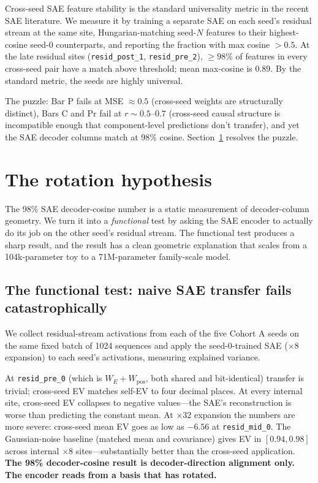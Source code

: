\documentclass[11pt,letterpaper]{article}
\begin{document}
Cross-seed SAE feature stability is the standard universality metric in the recent SAE literature. We measure it by training a separate SAE on each seed's residual stream at the same site, Hungarian-matching seed-$N$ features to their highest-cosine seed-0 counterparts, and reporting the fraction with max cosine $> 0.5$. At the late residual sites (\texttt{resid\_post\_1}, \texttt{resid\_pre\_2}), $\geq 98\%$ of features in every cross-seed pair have a match above threshold; mean max-cosine is $0.89$. By the standard metric, the seeds are highly universal.

The puzzle: Bar P fails at MSE $\approx 0.5$ (cross-seed weights are structurally distinct), Bars C and Pr fail at $r \sim 0.5$--$0.7$ (cross-seed causal structure is incompatible enough that component-level predictions don't transfer), and yet the SAE decoder columns match at 98\% cosine. Section~\ref{sec:rotation} resolves the puzzle.

\section{The rotation hypothesis}
\label{sec:rotation}

The 98\% SAE decoder-cosine number is a static measurement of decoder-column geometry. We turn it into a \emph{functional} test by asking the SAE encoder to actually do its job on the other seed's residual stream. The functional test produces a sharp result, and the result has a clean geometric explanation that scales from a 104k-parameter toy to a 71M-parameter family-scale model.

\subsection{The functional test: naive SAE transfer fails catastrophically}

We collect residual-stream activations from each of the five Cohort A seeds on the same fixed batch of 1024 sequences and apply the seed-0-trained SAE ($\times 8$ expansion) to each seed's activations, measuring explained variance.

At \texttt{resid\_pre\_0} (which is $W_E + W_{\mathrm{pos}}$, both shared and bit-identical) transfer is trivial; cross-seed EV matches self-EV to four decimal places. At every internal site, cross-seed EV collapses to negative values---the SAE's reconstruction is worse than predicting the constant mean. At $\times 32$ expansion the numbers are more severe: cross-seed mean EV goes as low as $-6.56$ at \texttt{resid\_mid\_0}. The Gaussian-noise baseline (matched mean and covariance) gives EV in $[0.94, 0.98]$ across internal $\times 8$ sites---substantially better than the cross-seed application. \textbf{The 98\% decoder-cosine result is decoder-direction alignment only. The encoder reads from a basis that has rotated.}
\end{document}
